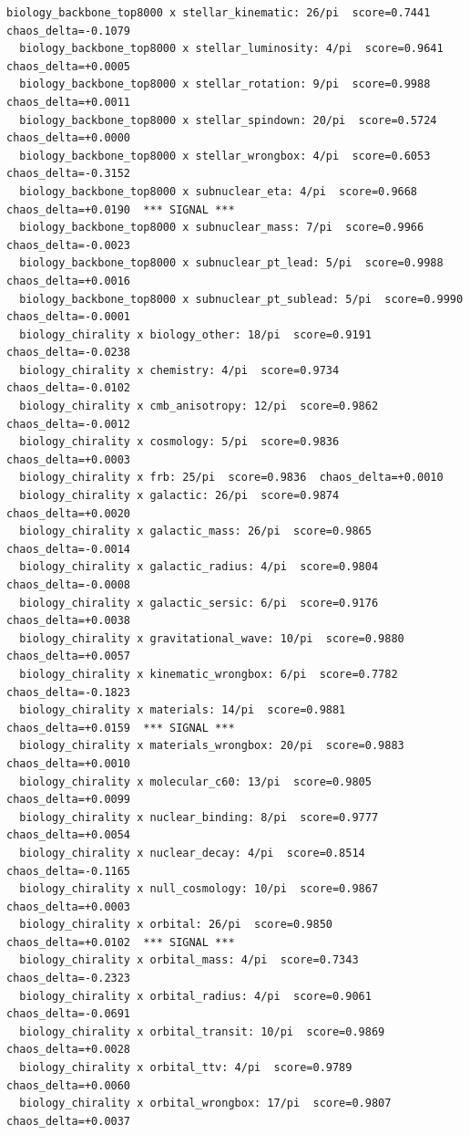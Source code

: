\documentclass[11pt, letterpaper, openany]{book}
\begin{document}
\begin{empiricalbox}
\begin{lstlisting}[style=terminal]
  biology_backbone_top8000 x stellar_kinematic: 26/pi  score=0.7441  chaos_delta=-0.1079
  biology_backbone_top8000 x stellar_luminosity: 4/pi  score=0.9641  chaos_delta=+0.0005
  biology_backbone_top8000 x stellar_rotation: 9/pi  score=0.9988  chaos_delta=+0.0011
  biology_backbone_top8000 x stellar_spindown: 20/pi  score=0.5724  chaos_delta=+0.0000
  biology_backbone_top8000 x stellar_wrongbox: 4/pi  score=0.6053  chaos_delta=-0.3152
  biology_backbone_top8000 x subnuclear_eta: 4/pi  score=0.9668  chaos_delta=+0.0190  *** SIGNAL ***
  biology_backbone_top8000 x subnuclear_mass: 7/pi  score=0.9966  chaos_delta=-0.0023
  biology_backbone_top8000 x subnuclear_pt_lead: 5/pi  score=0.9988  chaos_delta=+0.0016
  biology_backbone_top8000 x subnuclear_pt_sublead: 5/pi  score=0.9990  chaos_delta=-0.0001
  biology_chirality x biology_other: 18/pi  score=0.9191  chaos_delta=-0.0238
  biology_chirality x chemistry: 4/pi  score=0.9734  chaos_delta=-0.0102
  biology_chirality x cmb_anisotropy: 12/pi  score=0.9862  chaos_delta=-0.0012
  biology_chirality x cosmology: 5/pi  score=0.9836  chaos_delta=+0.0003
  biology_chirality x frb: 25/pi  score=0.9836  chaos_delta=+0.0010
  biology_chirality x galactic: 26/pi  score=0.9874  chaos_delta=+0.0020
  biology_chirality x galactic_mass: 26/pi  score=0.9865  chaos_delta=-0.0014
  biology_chirality x galactic_radius: 4/pi  score=0.9804  chaos_delta=-0.0008
  biology_chirality x galactic_sersic: 6/pi  score=0.9176  chaos_delta=+0.0038
  biology_chirality x gravitational_wave: 10/pi  score=0.9880  chaos_delta=+0.0057
  biology_chirality x kinematic_wrongbox: 6/pi  score=0.7782  chaos_delta=-0.1823
  biology_chirality x materials: 14/pi  score=0.9881  chaos_delta=+0.0159  *** SIGNAL ***
  biology_chirality x materials_wrongbox: 20/pi  score=0.9883  chaos_delta=+0.0010
  biology_chirality x molecular_c60: 13/pi  score=0.9805  chaos_delta=+0.0099
  biology_chirality x nuclear_binding: 8/pi  score=0.9777  chaos_delta=+0.0054
  biology_chirality x nuclear_decay: 4/pi  score=0.8514  chaos_delta=-0.1165
  biology_chirality x null_cosmology: 10/pi  score=0.9867  chaos_delta=+0.0003
  biology_chirality x orbital: 26/pi  score=0.9850  chaos_delta=+0.0102  *** SIGNAL ***
  biology_chirality x orbital_mass: 4/pi  score=0.7343  chaos_delta=-0.2323
  biology_chirality x orbital_radius: 4/pi  score=0.9061  chaos_delta=-0.0691
  biology_chirality x orbital_transit: 10/pi  score=0.9869  chaos_delta=+0.0028
  biology_chirality x orbital_ttv: 4/pi  score=0.9789  chaos_delta=+0.0060
  biology_chirality x orbital_wrongbox: 17/pi  score=0.9807  chaos_delta=+0.0037

\end{lstlisting}
\end{empiricalbox}
\end{document}
